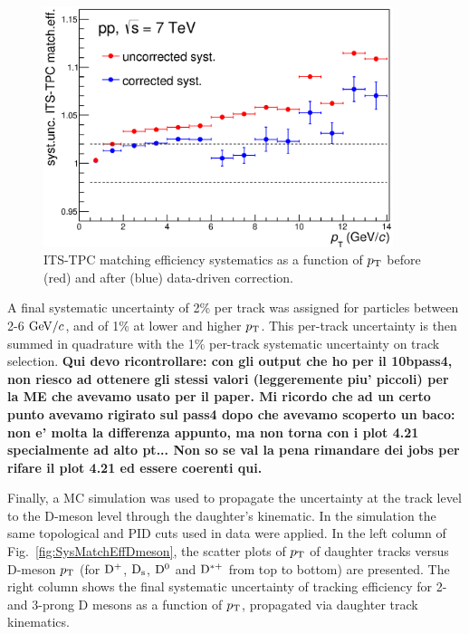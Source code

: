 \begin{enumerate}
\begin{figure}[!htb]
\begin{center}
\includegraphics[height=7cm]{FigCap4/ITSTPCmatchEffSyst_10bpass4_vsPt.eps}
\caption{ITS-TPC matching efficiency systematics as a function of $p_{\rm T}$ before (red) and after (blue) data-driven correction.}
\label{fig:MatchEffSystVsPt}
\end{center}
\end{figure}
A final systematic uncertainty of 2\% per track was assigned for particles 
between 2-6 $\mathrm{GeV}/c$, and of 1\% at lower and higher $p_{\rm T}$.
This per-track uncertainty is then summed in quadrature with the 
1\% per-track systematic uncertainty on track selection. 
{\bf Qui devo ricontrollare: con gli output che ho per il 10bpass4, non riesco ad ottenere
gli stessi valori (leggeremente piu' piccoli) per la ME che avevamo usato per il paper. Mi ricordo che ad un certo punto avevamo rigirato sul pass4 dopo che avevamo scoperto un baco: non e' molta la differenza appunto, ma non torna con i plot 4.21 specialmente ad alto pt... Non so se val la pena rimandare dei jobs per rifare il plot 4.21 ed essere coerenti qui.}
\end{enumerate}
Finally, a MC simulation was used to propagate the uncertainty at the 
track level to the D-meson level through the daughter's 
kinematic. In the simulation the same topological and PID cuts used in data were 
applied. In the left column of Fig.~\ref{fig:SysMatchEffDmeson}, the scatter plots of 
$p_{\rm T}$  of daughter tracks versus 
D-meson $p_{\rm T}$ (for ${\rm D^+}$, ${\rm D_s}$, ${\rm D^0}$ and ${\rm D^{*+}}$ from top to bottom) are presented. 
The right column shows the final systematic uncertainty of tracking 
efficiency for 2- and 3-prong D mesons as a function of $p_{\rm T}$, propagated via
daughter track kinematics.

